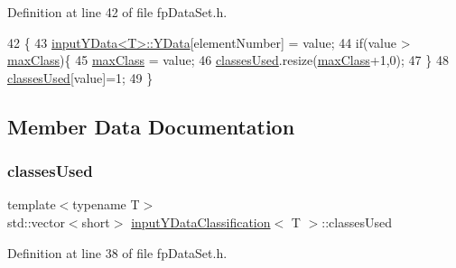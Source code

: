 Definition at line 42 of file fp\+Data\+Set.\+h.


\begin{DoxyCode}
42                                                                          \{
43             \hyperlink{classinputYData}{inputYData<T>::YData}[elementNumber] = value;
44             \textcolor{keywordflow}{if}(value > \hyperlink{classinputYDataClassification_a869375cfd78524833cd69aca9daf8aec}{maxClass})\{
45                 \hyperlink{classinputYDataClassification_a869375cfd78524833cd69aca9daf8aec}{maxClass} = value;
46                 \hyperlink{classinputYDataClassification_aa757e6d11b67d82357b863132155f933}{classesUsed}.resize(\hyperlink{classinputYDataClassification_a869375cfd78524833cd69aca9daf8aec}{maxClass}+1,0);
47             \}
48             \hyperlink{classinputYDataClassification_aa757e6d11b67d82357b863132155f933}{classesUsed}[value]=1;
49         \}
\end{DoxyCode}


\subsection{Member Data Documentation}
\mbox{\label{classinputYDataClassification_aa757e6d11b67d82357b863132155f933}} 
\subsubsection{\texorpdfstring{classes\+Used}{classesUsed}}
{\footnotesize\ttfamily template$<$typename T$>$ \\
std\+::vector$<$short$>$ \hyperlink{classinputYDataClassification}{input\+Y\+Data\+Classification}$<$ T $>$\+::classes\+Used\hspace{0.3cm}{\ttfamily [private]}}



Definition at line 38 of file fp\+Data\+Set.\+h.

\mbox{\label{classinputYDataClassification_a869375cfd78524833cd69aca9daf8aec}} 
